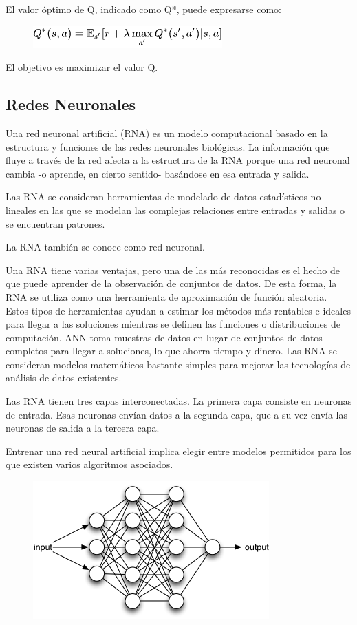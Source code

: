 El valor óptimo de Q, indicado como Q*, puede expresarse como:

\begin{figure}[ht]
	\centering
	\includegraphics[width=0.30\linewidth]{figuras/qvalue.png}
	\label{qvalue}
\end{figure}

El objetivo es maximizar el valor Q.

\subsection{Redes Neuronales}

Una red neuronal artificial (RNA) es un modelo computacional basado en la estructura y funciones de las redes neuronales biológicas. La información que fluye a través de la red afecta a la estructura de la RNA porque una red neuronal cambia -o aprende, en cierto sentido- basándose en esa entrada y salida.

Las RNA se consideran herramientas de modelado de datos estadísticos no lineales en las que se modelan las complejas relaciones entre entradas y salidas o se encuentran patrones.

La RNA también se conoce como red neuronal.



Una RNA tiene varias ventajas, pero una de las más reconocidas es el hecho de que puede aprender de la observación de conjuntos de datos. De esta forma, la RNA se utiliza como una herramienta de aproximación de función aleatoria. Estos tipos de herramientas ayudan a estimar los métodos más rentables e ideales para llegar a las soluciones mientras se definen las funciones o distribuciones de computación. ANN toma muestras de datos en lugar de conjuntos de datos completos para llegar a soluciones, lo que ahorra tiempo y dinero. Las RNA se consideran modelos matemáticos bastante simples para mejorar las tecnologías de análisis de datos existentes.

Las RNA tienen tres capas interconectadas. La primera capa consiste en neuronas de entrada. Esas neuronas envían datos a la segunda capa, que a su vez envía las neuronas de salida a la tercera capa.

Entrenar una red neural artificial implica elegir entre modelos permitidos para los que existen varios algoritmos asociados.

\begin{figure}[ht]
	\centering
	\includegraphics[width=0.30\linewidth]{figuras/neuralNetwork.png}
	\label{qvalue}
\end{figure}

